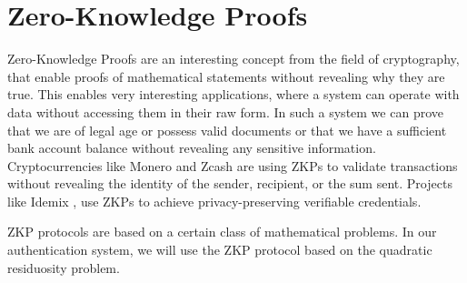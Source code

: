 \documentclass[12pt]{article}
\begin{document}
%		
	
	\section{Zero-Knowledge Proofs}
	Zero-Knowledge Proofs \cite{goldwasser1989knowledge} are an interesting concept from the field of cryptography, that enable proofs of mathematical statements without revealing why they are true.
	This enables very interesting applications, where a system can operate with data without accessing them in their raw form.
	In such a system we can prove that we are of legal age or possess valid documents or that we have a sufficient bank account balance without revealing any sensitive information.
	Cryptocurrencies like Monero and Zcash are using ZKPs to validate transactions without revealing the identity of the sender, recipient, or the sum sent.
	Projects like Idemix \cite{camenisch2002design}, use ZKPs to achieve privacy-preserving verifiable credentials.
	
	ZKP protocols are based on a certain class of mathematical problems.
	In our authentication system, we will use the ZKP protocol based on the quadratic residuosity problem.
	
\end{document}
